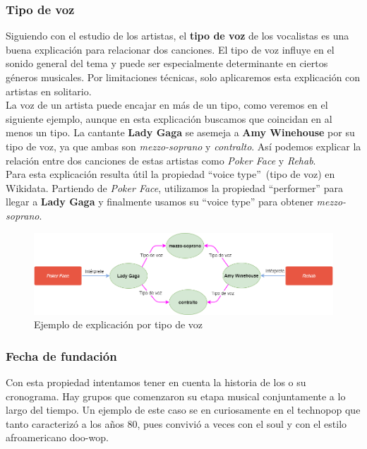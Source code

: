\subsubsection*{Tipo de voz}

Siguiendo con el estudio de los artistas, el \textbf{tipo de voz} de los vocalistas es una buena explicación para relacionar dos canciones. El tipo de voz influye en el sonido general del tema y puede ser especialmente determinante en ciertos géneros musicales. Por limitaciones técnicas, solo aplicaremos esta explicación con artistas en solitario.\\

La voz de un artista puede encajar en más de un tipo, como veremos en el siguiente ejemplo, aunque en esta explicación buscamos que coincidan en al menos un tipo. La cantante \textbf{Lady Gaga} se asemeja a \textbf{Amy Winehouse} por su tipo de voz, ya que ambas son \textit{mezzo-soprano} y \textit{contralto}. Así podemos explicar la relación entre dos canciones de estas artistas como \textit{Poker Face} y \textit{Rehab}.\\

Para esta explicación resulta útil la propiedad ``voice type''~(tipo de voz) en Wikidata. Partiendo de \textit{Poker Face}, utilizamos la propiedad ``performer'' para llegar a \textbf{Lady Gaga} y finalmente usamos su ``voice type'' para obtener \textit{mezzo-soprano}.\\

\begin{figure}[h!]
	\centering
	\includegraphics[width = 1\textwidth]{Imagenes/Bitmap/Voz ejemplo.png}
	\caption{Ejemplo de explicación por tipo de voz}
	\label{fig:sampleImage}
\end{figure}

\subsubsection*{Fecha de fundación}

Con esta propiedad intentamos tener en cuenta la historia de los o su cronograma. Hay grupos que comenzaron su etapa musical  conjuntamente a lo largo del tiempo. Un ejemplo de este caso se en curiosamente en el technopop que tanto caracterizó a los años 80, pues convivió a veces con el soul y con el estilo afroamericano doo-wop.\\

